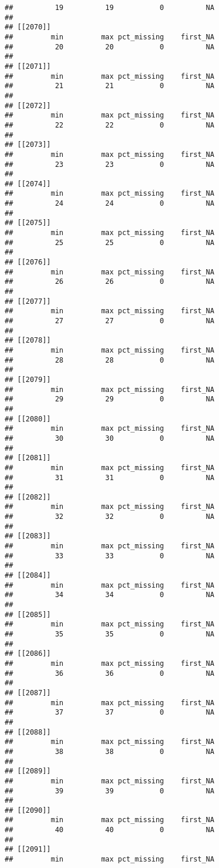 \documentclass[
]{article}
\begin{document}
\begin{verbatim}
##          19          19           0          NA 
## 
## [[2070]]
##         min         max pct_missing    first_NA 
##          20          20           0          NA 
## 
## [[2071]]
##         min         max pct_missing    first_NA 
##          21          21           0          NA 
## 
## [[2072]]
##         min         max pct_missing    first_NA 
##          22          22           0          NA 
## 
## [[2073]]
##         min         max pct_missing    first_NA 
##          23          23           0          NA 
## 
## [[2074]]
##         min         max pct_missing    first_NA 
##          24          24           0          NA 
## 
## [[2075]]
##         min         max pct_missing    first_NA 
##          25          25           0          NA 
## 
## [[2076]]
##         min         max pct_missing    first_NA 
##          26          26           0          NA 
## 
## [[2077]]
##         min         max pct_missing    first_NA 
##          27          27           0          NA 
## 
## [[2078]]
##         min         max pct_missing    first_NA 
##          28          28           0          NA 
## 
## [[2079]]
##         min         max pct_missing    first_NA 
##          29          29           0          NA 
## 
## [[2080]]
##         min         max pct_missing    first_NA 
##          30          30           0          NA 
## 
## [[2081]]
##         min         max pct_missing    first_NA 
##          31          31           0          NA 
## 
## [[2082]]
##         min         max pct_missing    first_NA 
##          32          32           0          NA 
## 
## [[2083]]
##         min         max pct_missing    first_NA 
##          33          33           0          NA 
## 
## [[2084]]
##         min         max pct_missing    first_NA 
##          34          34           0          NA 
## 
## [[2085]]
##         min         max pct_missing    first_NA 
##          35          35           0          NA 
## 
## [[2086]]
##         min         max pct_missing    first_NA 
##          36          36           0          NA 
## 
## [[2087]]
##         min         max pct_missing    first_NA 
##          37          37           0          NA 
## 
## [[2088]]
##         min         max pct_missing    first_NA 
##          38          38           0          NA 
## 
## [[2089]]
##         min         max pct_missing    first_NA 
##          39          39           0          NA 
## 
## [[2090]]
##         min         max pct_missing    first_NA 
##          40          40           0          NA 
## 
## [[2091]]
##         min         max pct_missing    first_NA 

\end{verbatim}
\end{document}
